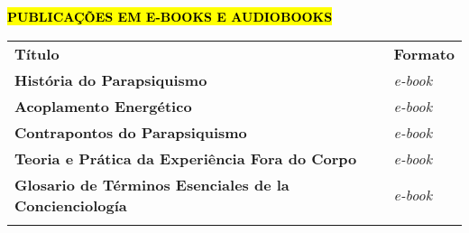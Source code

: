 \textbf{\hl{PUBLICAÇÕES EM E-BOOKS E AUDIOBOOKS}}

\begin{longtable}[]{@{}
  >{\raggedright\arraybackslash}p{}
  >{\raggedright\arraybackslash}p{}@{}}
\toprule\noalign{}
\begin{minipage}[b]{\linewidth}\centering
\textbf{Título}
\end{minipage} & \begin{minipage}[b]{\linewidth}\centering
\textbf{Formato}
\end{minipage} \\
\begin{minipage}[b]{\linewidth}\raggedright
\textbf{História do Parapsiquismo}
\end{minipage} & \begin{minipage}[b]{\linewidth}\raggedright
\emph{e-book}
\end{minipage} \\
\begin{minipage}[b]{\linewidth}\raggedright
\textbf{Acoplamento Energético}
\end{minipage} & \begin{minipage}[b]{\linewidth}\raggedright
\emph{e-book}
\end{minipage} \\
\begin{minipage}[b]{\linewidth}\raggedright
\textbf{Contrapontos do Parapsiquismo}
\end{minipage} & \begin{minipage}[b]{\linewidth}\raggedright
\emph{e-book}
\end{minipage} \\
\begin{minipage}[b]{\linewidth}\raggedright
\textbf{Teoria e Prática da Experiência Fora do Corpo}
\end{minipage} & \begin{minipage}[b]{\linewidth}\raggedright
\emph{e-book}
\end{minipage} \\
\begin{minipage}[b]{\linewidth}\raggedright
\textbf{Glosario de Términos Esenciales de la Concienciología}
\end{minipage} & \begin{minipage}[b]{\linewidth}\raggedright
\emph{e-book}
\end{minipage} \\
\begin{minipage}[b]{\linewidth}\raggedright

\end{minipage}
\end{longtable}
